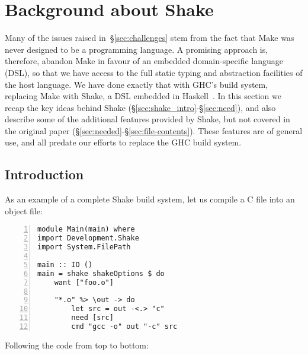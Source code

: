 \section{Background about Shake\label{sec:shake}}

Many of the issues raised in~\S\ref{sec:challenges} stem from the fact
that Make was never designed to be a programming language.  A
promising approach is, therefore, abandon Make in favour of an
embedded domain-specific language (DSL), so that we have access to the full
static typing and abstraction facilities of the host language.
We have done exactly that with GHC's build system, replacing Make with
Shake, a DSL embedded in Haskell~\cite{shake}. In this section we
recap the key ideas behind Shake (\S\ref{sec:shake_intro}-\S\ref{sec:need}), and
also describe some of the additional features provided by Shake, but not covered
in the original paper (\S\ref{sec:needed}-\S\ref{sec:file-contents}). These features
are of general use, and all predate our efforts to replace the GHC build system.

\subsection{Introduction\label{sec:shake_intro}}

As an example of a complete
Shake build system, let us compile a C file into an object file:

\begin{lstlisting}[numbers=left,xleftmargin=2em,framexleftmargin=1.5em]
module Main(main) where
import Development.Shake
import System.FilePath

main :: IO ()
main = shake shakeOptions $ do
    want ["foo.o"]

    "*.o" %> \out -> do
        let src = out -<.> "c"
        need [src]
        cmd "gcc -o" out "-c" src
\end{lstlisting}

\noindent Following the code from top to bottom:

